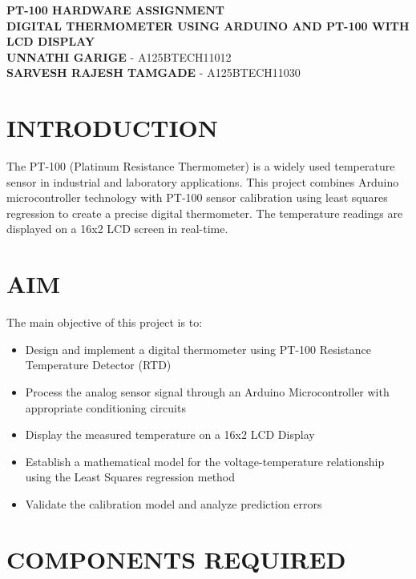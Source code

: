 \documentclass[journal]{IEEEtran}
\begin{document}
\thispagestyle{empty}

\begin{center}
{\Large \textbf{PT-100 HARDWARE ASSIGNMENT}}\\[0.8cm]
{\normalsize \textbf{DIGITAL THERMOMETER USING ARDUINO AND PT-100 WITH LCD DISPLAY}}\\[0.8cm]
{\small \textbf{UNNATHI GARIGE} - A125BTECH11012\\
\textbf{SARVESH RAJESH TAMGADE} - A125BTECH11030}
\end{center}

\vspace{0.5cm}

\section{\textbf{INTRODUCTION}}

The PT-100 (Platinum Resistance Thermometer) is a widely used temperature sensor in industrial and laboratory applications. This project combines Arduino microcontroller technology with PT-100 sensor calibration using least squares regression to create a precise digital thermometer. The temperature readings are displayed on a 16x2 LCD screen in real-time.

\section{\textbf{AIM}}

The main objective of this project is to:
\begin{itemize}
\item Design and implement a digital thermometer using PT-100 Resistance Temperature Detector (RTD)
\item Process the analog sensor signal through an Arduino Microcontroller with appropriate conditioning circuits
\item Display the measured temperature on a 16x2 LCD Display
\item Establish a mathematical model for the voltage-temperature relationship using the Least Squares regression method
\item Validate the calibration model and analyze prediction errors
\end{itemize}

\section{\textbf{COMPONENTS REQUIRED}}
\end{document}
